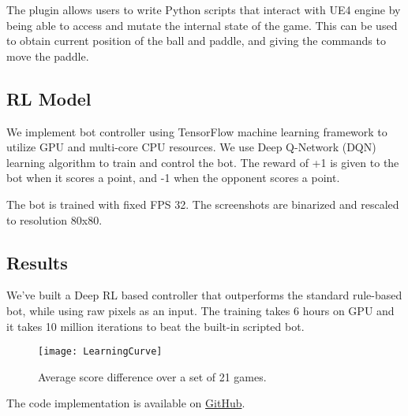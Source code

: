 The plugin allows users to write Python scripts that interact with UE4 engine by being able to access and mutate the internal state of the game.
This can be used to obtain current position of the ball and paddle, and giving the commands to move the paddle.

\subsection{RL Model}

We implement bot controller using TensorFlow machine learning framework \cite{tensorflow2015-whitepaper} to utilize GPU and multi-core CPU resources.
We use Deep Q-Network (DQN) \cite{mnih-dqn-2015} learning algorithm to train and control the bot.
The reward of +1 is given to the bot when it scores a point, and -1 when the opponent scores a point.

The bot is trained with fixed FPS 32. The screenshots are binarized and rescaled to resolution 80x80.

\subsection{Results}

We've built a Deep RL based controller that outperforms the standard rule-based bot, while using raw pixels as an input.
The training takes 6 hours on GPU and it takes 10 million iterations to beat the built-in scripted bot.

\begin{figure}[h!]
\caption{Average score difference over a set of 21 games.}
\texttt{[image: LearningCurve]}
\end{figure}

The code implementation is available on \href{https://github.com/akashin/HSE_AI_Labs/tree/master/Lab_4}{GitHub}.